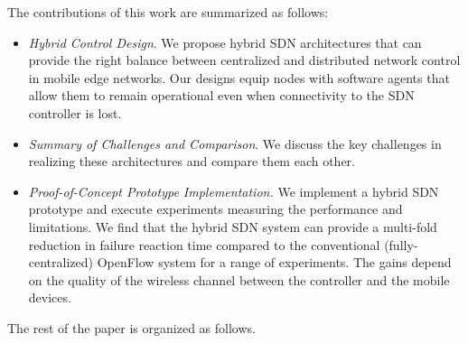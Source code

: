 The contributions of this work are summarized as follows:
\begin{itemize}

\item \emph{Hybrid Control Design}. We propose hybrid SDN architectures that can provide the right balance between centralized and distributed network control in mobile edge networks. Our designs equip nodes with software agents that allow them to remain operational even when connectivity to the SDN controller is lost.

\item \emph{Summary of Challenges and Comparison}. We discuss the key challenges in realizing these architectures and compare them each other.


\item \emph{Proof-of-Concept Prototype Implementation.} We implement a hybrid SDN prototype and execute experiments measuring the performance and limitations. We find that the hybrid SDN system can provide a multi-fold reduction in failure reaction time compared to the conventional (fully-centralized) OpenFlow system for a range of experiments. The gains depend on the quality of the wireless channel between the controller and the mobile devices.

\end{itemize}

The rest of the paper is organized as follows. 
